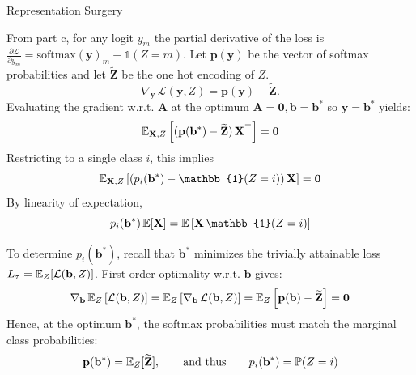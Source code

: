 \begin{question}{Representation Surgery}
\begin{subquestion}
From part c, for any logit $y_m$ the partial derivative of the loss is $\frac{\partial \mathcal{L}}{\partial y_m} = \mathrm{softmax}(\mathbf{y})_m - \mathbb{1}(Z = m)$.
Let $\mathbf{p}(\mathbf{y})$ be the vector of softmax probabilities and let $\widetilde{\mathbf{Z}}$ be the one hot encoding of $Z$.
\begin{equation}
    \nabla_{\mathbf{y}}\, \mathcal{L}(\mathbf{y}, Z) = \mathbf{p}(\mathbf{y}) - \widetilde{\mathbf{Z}}.
\end{equation}
Evaluating the gradient w.r.t. $\mathbf{A}$ at the optimum $\mathbf{A} = \mathbf{0}, \mathbf{b} = \mathbf{b}^\ast$ so $\mathbf{y} = \mathbf{b}^\ast$ yields:
\begin{equation}
    \expectation_{\mathbf{X}, Z}\left[(\mathbf{p}(\mathbf{b}^\ast) - \widetilde{\mathbf{Z}})\, \mathbf{X}^\top\right] = \mathbf{0}
\end{equation}
Restricting to a single class $i$, this implies
\begin{equation}
    \expectation_{\mathbf{X}, Z}\left[(p_i(\mathbf{b}^\ast) - \mathbb{1}(Z = i))\, \mathbf{X}\right] = \mathbf{0}
\end{equation}
By linearity of expectation,
\begin{equation}
    p_i(\mathbf{b}^\ast)\, \expectation[\mathbf{X}] = \expectation\left[\mathbf{X}\, \mathbb{1}(Z = i)\right]
\end{equation}

To determine $p_i(\mathbf{b}^\ast)$, recall that $\mathbf{b}^\ast$ minimizes the trivially attainable loss $L_\tau = \expectation_Z[\mathcal{L}(\mathbf{b}, Z)]$. 
First order optimality w.r.t. $\mathbf{b}$ gives:
\begin{equation}
    \nabla_{\mathbf{b}}\, \expectation_Z\left[\mathcal{L}(\mathbf{b}, Z)\right] = \expectation_Z\left[\nabla_{\mathbf{b}}\, \mathcal{L}(\mathbf{b}, Z)\right] = \expectation_Z\left[\mathbf{p}(\mathbf{b}) - \widetilde{\mathbf{Z}}\right] = \mathbf{0}
\end{equation}
Hence, at the optimum $\mathbf{b}^\ast$, the softmax probabilities must match the marginal class probabilities:
\begin{equation}
    \mathbf{p}(\mathbf{b}^\ast) = \expectation_Z[\widetilde{\mathbf{Z}}], \qquad\text{and thus}\qquad p_i(\mathbf{b}^\ast) = \mathbb{P}(Z = i)
\end{equation}


\end{subquestion}
\end{question}
